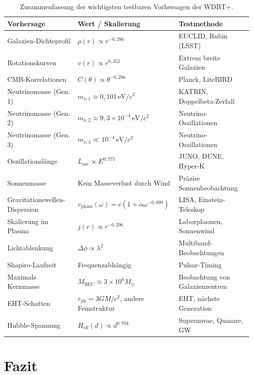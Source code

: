 \begin{table}[htbp]
\centering
\small
\begin{tabularx}{\textwidth}{|l|X|X|}
\hline
\textbf{Vorhersage} & \textbf{Wert / Skalierung} & \textbf{Testmethode} \\
\hline
Galaxien-Dichteprofil & \(\rho(r) \propto r^{-0,296}\) & EUCLID, Rubin (LSST) \\
Rotationskurven & \(v(r) \propto r^{0,352}\) & Extrem breite Galaxien \\
CMB-Korrelationen & \(C(\theta) \propto \theta^{-0,296}\) & Planck, LiteBIRD \\
Neutrinomasse (Gen. 1) & \(m_{\nu,1} \approx 0,101 \, \text{eV}/c^2\) & KATRIN, Doppelbeta-Zerfall \\
Neutrinomasse (Gen. 2) & \(m_{\nu,2} \approx 9,3 \times 10^{-4} \, \text{eV}/c^2\) & Neutrino-Oszillationen \\
Neutrinomasse (Gen. 3) & \(m_{\nu,3} \ll 10^{-4} \, \text{eV}/c^2\) & Neutrino-Oszillationen \\
Oszillationslänge & \(L_{\text{osc}} \propto E^{0,775}\) & JUNO, DUNE, Hyper-K \\
Sonnenmasse & Kein Masseverlust durch Wind & Präzise Sonnenbeobachtung \\
Gravitationswellen-Dispersion & \(v_{\text{phase}}(\omega) = c(1 + \alpha \omega^{-0,099})\) & LISA, Einstein-Teleskop \\
Skalierung im Plasma & \(j(r) \propto r^{-0,296}\) & Laborplasmen, Sonnenwind \\
Lichtablenkung & \(\Delta\phi \propto \lambda^2\) & Multiband-Beobachtungen \\
Shapiro-Laufzeit & Frequenzabhängig & Pulsar-Timing \\
Maximale Kernmasse & \(M_{\text{BEC}} \approx 3 \times 10^6 M_\odot\) & Beobachtung von Galaxienzentren \\
EHT-Schatten & \(r_{\text{ph}} = 3GM/c^2\), andere Feinstruktur & EHT, nächste Generation \\
Hubble-Spannung & \(H_{\text{eff}}(d) \propto d^{0,704}\) & Supernovae, Quasare, GW \\
\hline
\end{tabularx}
\caption{Zusammenfassung der wichtigsten testbaren Vorhersagen der WDBT+.}
\label{tab:vorhersagen}
\end{table}

\section{Fazit}
\label{sec:vorh_fazit}

